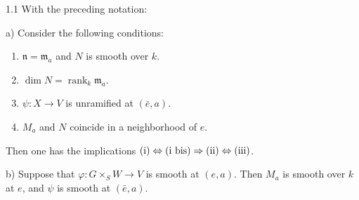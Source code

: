 \begin{lemma}{1.1}\label{XIII.1.1}
With the preceding notation:

\noindent a) Consider the following conditions:
\begin{enumerate}[label=\textup{(\roman*)}]
\item $\mathfrak n=\mathfrak m_a$ and $N$ is smooth over $k$.
\item[\textup{(i bis)}] $\dim N=\operatorname{rank}_k\mathfrak m_a$.
\item $\psi:X\to V$ is unramified at $(\bar e,a)$.
\item $M_a$ and $N$ coincide in a neighborhood of $e$.
\end{enumerate}
Then one has the implications
$\textup{(i)}\Leftrightarrow\textup{(i bis)}\Rightarrow\textup{(ii)}
\Leftrightarrow\textup{(iii)}$.

\noindent b) Suppose that $\varphi:G\times_S W\to V$ is smooth at $(e,a)$.
Then $M_a$ is smooth over $k$ at $e$, and $\psi$ is smooth at $(\bar e,a)$.
\end{lemma}

